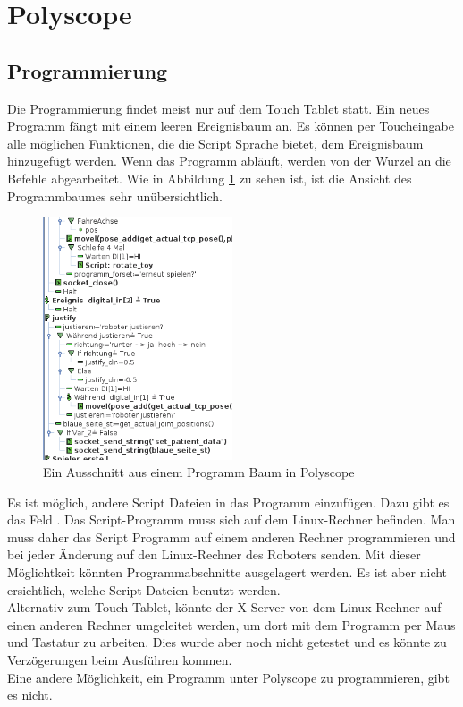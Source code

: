 \section{Polyscope}
\label{sec:Polyscope_rel}

\subsection{Programmierung}
\label{sub:programmierung_polyscope_rel}

Die Programmierung findet meist nur auf dem Touch Tablet statt. Ein neues Programm fängt mit einem leeren Ereignisbaum an. Es können per Toucheingabe alle möglichen Funktionen, die die Script Sprache bietet, dem Ereignisbaum hinzugefügt werden. Wenn das Programm abläuft, werden von der Wurzel an die Befehle abgearbeitet.
Wie in Abbildung \ref{fig:programm_in_polyscope} zu sehen ist, ist die Ansicht des Programmbaumes sehr unübersichtlich.

\begin{figure}[H]
  \centering
    \includegraphics[width=0.5\textwidth]{pic/polyscope_program_tree.png}
      \caption[Programm Baum in Polyscope]{Ein Ausschnitt aus einem Programm Baum in Polyscope}
      \label{fig:programm_in_polyscope}
\end{figure}

Es ist möglich, andere Script Dateien in das Programm einzufügen. Dazu gibt es das Feld . Das Script-Programm muss sich auf dem Linux-Rechner befinden. Man muss daher das Script Programm auf einem anderen Rechner programmieren und bei jeder Änderung auf den Linux-Rechner des Roboters senden. Mit dieser Möglichtkeit könnten Programmabschnitte ausgelagert werden. Es ist aber nicht ersichtlich, welche Script Dateien benutzt werden.\\
Alternativ zum Touch Tablet, könnte der X-Server von dem Linux-Rechner auf einen anderen Rechner umgeleitet werden, um dort mit dem Programm per Maus und Tastatur zu arbeiten. Dies wurde aber noch nicht getestet und es könnte zu Verzögerungen beim Ausführen kommen.
\\
Eine andere Möglichkeit, ein Programm unter Polyscope zu programmieren, gibt es nicht.

